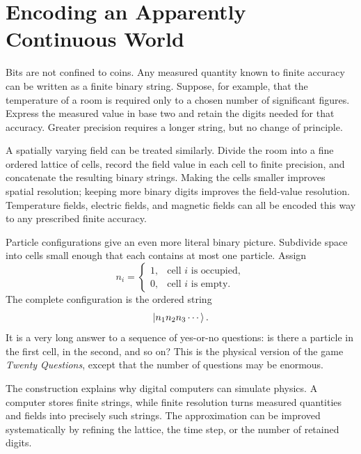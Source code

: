 \section{Encoding an Apparently Continuous World}

Bits are not confined to coins. Any measured quantity known to finite accuracy can be written as a finite binary string. Suppose, for example, that the temperature of a room is required only to a chosen number of significant figures. Express the measured value in base two and retain the digits needed for that accuracy. Greater precision requires a longer string, but no change of principle.

A spatially varying field can be treated similarly. Divide the room into a fine ordered lattice of cells, record the field value in each cell to finite precision, and concatenate the resulting binary strings. Making the cells smaller improves spatial resolution; keeping more binary digits improves the field-value resolution. Temperature fields, electric fields, and magnetic fields can all be encoded this way to any prescribed finite accuracy.

Particle configurations give an even more literal binary picture. Subdivide space into cells small enough that each contains at most one particle. Assign
\begin{equation}
  n_i=
  \begin{cases}
    1,&\text{cell \(i\) is occupied},\\
    0,&\text{cell \(i\) is empty}.
  \end{cases}
  \label{eq:l01-occupancy-bit}
\end{equation}
The complete configuration is the ordered string
\begin{equation}
  \left\lvert n_1n_2n_3\cdots\right\rangle.
\end{equation}
It is a very long answer to a sequence of yes-or-no questions: is there a particle in the first cell, in the second, and so on? This is the physical version of the game \emph{Twenty Questions}, except that the number of questions may be enormous.

The construction explains why digital computers can simulate physics. A computer stores finite strings, while finite resolution turns measured quantities and fields into precisely such strings. The approximation can be improved systematically by refining the lattice, the time step, or the number of retained digits.

\begin{classroomqa}
\end{classroomqa}

